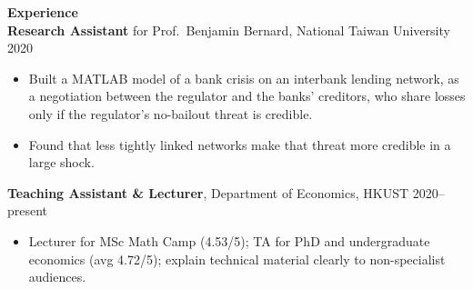 \documentclass[11pt,letterpaper]{article}
\begin{document}
{\large \textbf{Experience}}\\[-0.5pt]
\textbf{Research Assistant} for Prof.\ Benjamin Bernard, National Taiwan University \hfill 2020\\
\vspace{-6pt}
\begin{itemize}
  \item Built a MATLAB model of a bank crisis on an interbank lending network, as a negotiation between the regulator and the banks' creditors, who share losses only if the regulator's no-bailout threat is credible.
  \item Found that less tightly linked networks make that threat more credible in a large shock.
\end{itemize}
\textbf{Teaching Assistant \& Lecturer}, Department of Economics, HKUST \hfill 2020--present\\
\vspace{-6pt}
\begin{itemize}
  \item Lecturer for MSc Math Camp (4.53/5); TA for PhD and undergraduate economics (avg 4.72/5); explain technical material clearly to non-specialist audiences.
\end{itemize}

\vspace{0.15pt}
\end{document}
